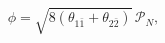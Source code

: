 \begin{equation}
 \phi=\sqrt{8(\theta_{1\bar{1}}+\theta_{2\bar{2}})}\,
 \mathcal{P}_N,
\end{equation}

